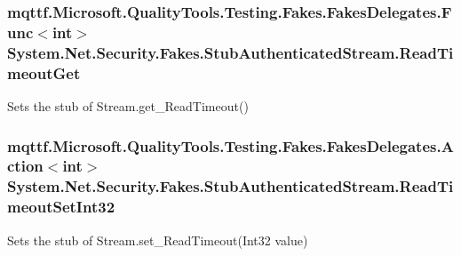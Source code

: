 \hypertarget{class_system_1_1_net_1_1_security_1_1_fakes_1_1_stub_authenticated_stream_a0faf0029c2aaa0aaca8c60085736de43}{
\subsubsection[{Read\-Timeout\-Get}]{\setlength{\rightskip}{0pt plus 5cm}mqttf.\-Microsoft.\-Quality\-Tools.\-Testing.\-Fakes.\-Fakes\-Delegates.\-Func$<$int$>$ System.\-Net.\-Security.\-Fakes.\-Stub\-Authenticated\-Stream.\-Read\-Timeout\-Get}}\label{class_system_1_1_net_1_1_security_1_1_fakes_1_1_stub_authenticated_stream_a0faf0029c2aaa0aaca8c60085736de43}


Sets the stub of Stream.\-get\-\_\-\-Read\-Timeout()

\hypertarget{class_system_1_1_net_1_1_security_1_1_fakes_1_1_stub_authenticated_stream_a56c54f4c4c390fad8736f26d44d64721}{
\subsubsection[{Read\-Timeout\-Set\-Int32}]{\setlength{\rightskip}{0pt plus 5cm}mqttf.\-Microsoft.\-Quality\-Tools.\-Testing.\-Fakes.\-Fakes\-Delegates.\-Action$<$int$>$ System.\-Net.\-Security.\-Fakes.\-Stub\-Authenticated\-Stream.\-Read\-Timeout\-Set\-Int32}}\label{class_system_1_1_net_1_1_security_1_1_fakes_1_1_stub_authenticated_stream_a56c54f4c4c390fad8736f26d44d64721}


Sets the stub of Stream.\-set\-\_\-\-Read\-Timeout(\-Int32 value)

